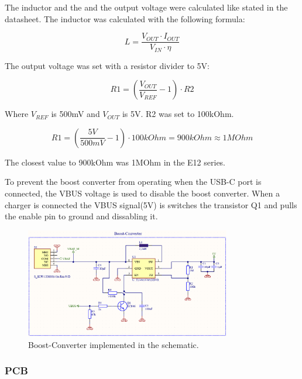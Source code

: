         The inductor and the and the output voltage were calculated like stated in the
        datasheet\cite{noauthor_tlv61070apdf_2022}. The inductor was calculated with the following formula:
        
        \begin{equation}
            L = \frac{V_{OUT} \cdot I_{OUT}}{V_{IN} \cdot \eta}
        \end{equation}  

        The output voltage was set with a resistor divider to 5V:

        \begin{equation}
            R1 = ( \frac{V_{OUT}}{V_{REF}} - 1) \cdot R2
        \end{equation}

        Where $V_{REF}$ \cite{noauthor_tlv61070apdf_2022} is 500mV and $V_{OUT}$ is 5V. R2 was set to 100kOhm.

        \begin{equation}
            R1 = ( \frac{5V}{500mV} - 1) \cdot 100kOhm = 900kOhm \approx 1MOhm
        \end{equation}

        The closest value to 900kOhm was 1MOhm in the E12 series.
        
        To prevent the boost converter from operating when the USB-C port is connected, the
        VBUS voltage is used to disable the boost converter. When a charger is connected
        the VBUS signal(5V) is switches the transistor Q1 and pulls the enable pin to ground 
        and dissabling it.
        
        \begin{figure}[H]
        \centering
        \includegraphics[width=0.8\textwidth]{assets/HW/Boost-Converter.png}
        \caption{Boost-Converter implemented in the schematic.}
        \end{figure}

    \subsubsection{PCB}

